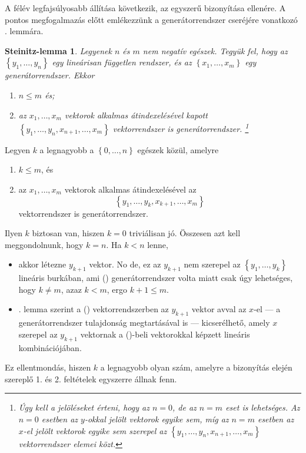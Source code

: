 \documentclass[9pt, a4paper, showtrims]{memoir}
\makeatletter
\let\Aref\relax
\renewenvironment{proof}[1][\proofname]
    {\par\pushQED{\qed}%
    \normalfont \topsep6\p@\@plus6\p@\relax
    \trivlist
    \item[\hskip\labelsep
        \itshape
    #1\@addpunct{:}]\ignorespaces}
    {\popQED\endtrivlist\@endpefalse}
\theoremstyle{plain}
\newtheorem*{SL}{Steinitz-lemma}
\theoremstyle{remark}
\theoremstyle{definition}
\makeatother
\begin{document}
A félév legfajsúlyosabb állítása következik, az egyszerű bizonyítása ellenére.
A pontos megfogalmazás előtt emlékezzünk a generátorrendszer cseréjére vonatkozó . lemmára.
\begin{SL}
	Legyenek $n$ és $m$ nem negatív egészek.
	Tegyük fel, hogy az $\left\{ y_1,\ldots,y_n \right\}$ egy lineárisan független rendszer,
	és az
	$\left\{ x_1,\ldots,x_m \right\}$ egy generátorrendszer.
	Ekkor
	\begin{enumerate}
		\item $n\leq m$ és;
		\item az $x_1,\ldots,x_m$ vektorok alkalmas átindexelésével kapott
		      \(
		      \left\{ y_1,\ldots,y_n,x_{n+1},\ldots,x_m \right\}
		      \)
		      vektorrendszer is generátorrendszer.%
		      \footnote{Úgy kell a jelöléseket érteni, hogy az $n=0$, de az $n=m$ eset is lehetséges.
		      Az $n=0$ esetben az $y$-okkal jelölt vektorok egyike sem,
		      míg az $n=m$ esetben az $x$-el jelölt vektorok egyike sem szerepel az
		      \(
		      \left\{ y_1,\ldots,y_n,x_{n+1},\ldots,x_m \right\}
		      \)
		      vektorrendszer elemei közt.}%
		      \qedhere
	\end{enumerate}
	\label{le:Steinitz}
\end{SL}
\begin{proof}
	Legyen $k$ a legnagyobb a $\left\{ 0,\ldots,n \right\}$ egészek közül, amelyre
	\begin{enumerate}
		\item $k\leq m$, és
		\item az $x_1,\ldots,x_m$ vektorok alkalmas átindexelésével az
		      \[
			      \left\{ y_1,\ldots,y_k,x_{k+1},\ldots,x_m \right\}\tag{\dag}
		      \]
		      vektorrendszer is generátorrendszer.
	\end{enumerate}
	Ilyen $k$ biztosan van, hiszen $k=0$ triviálisan jó.
	Összesen azt kell meggondolnunk, hogy $k=n$.
	Ha $k<n$ lenne,
	\begin{itemize}
		\item
		      akkor létezne $y_{k+1}$ vektor.
		      No de, ez az $y_{k+1}$ nem szerepel az $\left\{ y_1,\ldots,y_k \right\}$ lineáris burkában,
		      ami (\dag) generátorrendszer volta miatt csak úgy lehetséges,
		      hogy $k\neq m$, azaz $k<m$, ergo $k+1\leq m$.
		\item
		      \Aref{le:gencsere}. lemma szerint a (\dag) vektorrendszerben az $y_{k+1}$ vektor
		      avval az $x$-el
		      --- a generátorrendszer tulajdonság megtartásával is ---
		      kicserélhető,
		      amely $x$ szerepel az $y_{k+1}$ vektornak a (\dag)-beli
		      vektorokkal képzett lineáris kombinációjában.
	\end{itemize}
	Ez ellentmondás, hiszen $k$ a legnagyobb olyan szám,
	amelyre a bizonyítás elején szereplő 1. és 2. feltételek egyszerre állnak fenn.
\end{proof}
\end{document}
